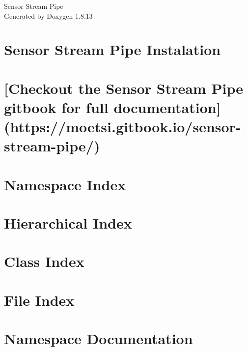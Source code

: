 \documentclass[twoside]{book}
\newcommand{\+}{\discretionary{\mbox{\scriptsize$\hookleftarrow$}}{}{}}
\newcommand{\clearemptydoublepage}{%
  \newpage{\pagestyle{empty}\cleardoublepage}%
}
\begin{document}
\hypersetup{pageanchor=false,
             bookmarksnumbered=true,
             pdfencoding=unicode
            }
\begin{titlepage}
\vspace*{7cm}
\begin{center}%
{\Large Sensor Stream Pipe }\\
\vspace*{1cm}
{\large Generated by Doxygen 1.8.13}\\
\end{center}
\end{titlepage}
\clearemptydoublepage
{}
\tableofcontents
\clearemptydoublepage
{}
\hypersetup{pageanchor=true}

\chapter{Sensor Stream Pipe Instalation}
\label{md_INSTALL}

\chapter{\mbox{[}Checkout the Sensor Stream Pipe gitbook for full documentation\mbox{]}(https\+://moetsi.gitbook.\+io/sensor-\/stream-\/pipe/)}
\label{md_README}

\chapter{Namespace Index}

\chapter{Hierarchical Index}

\chapter{Class Index}

\chapter{File Index}

\chapter{Namespace Documentation}


\end{document}
